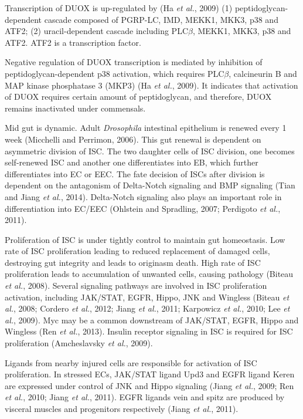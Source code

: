 \documentclass[11pt]{article}
\begin{document}
\begin{sloppypar}
Transcription of DUOX is up-regulated by (Ha \textit{et al.}, 2009) 
(1) peptidoglycan-dependent cascade composed of PGRP-LC, IMD, MEKK1, MKK3, p38 and ATF2; 
(2) uracil-dependent cascade including PLC$\beta$, MEKK1, MKK3, p38 and ATF2. 
ATF2 is a transcription factor. 
\par
Negative regulation of DUOX transcription is mediated by inhibition of peptidoglycan-dependent p38 activation, which requires PLC$\beta$, calcineurin B and MAP kinase phosphatase 3 (MKP3) (Ha \textit{et al.}, 2009). 
It indicates that activation of DUOX requires certain amount of peptidoglycan, and therefore, DUOX remains inactivated under commensals.
\par
Mid gut is dynamic. 
Adult \textit{Drosophila} intestinal epithelium is renewed every 1 week (Micchelli and Perrimon, 2006). 
This gut renewal is dependent on asymmetric division of ISC. 
The two daughter cells of ISC division, one becomes self-renewed ISC and another one differentiates into EB, which further differentiates into EC or EEC. 
The fate decision of ISCs after division is dependent on the antagonism of Delta-Notch signaling and BMP signaling (Tian and Jiang \textit{et al.}, 2014). 
Delta-Notch signaling also plays an important role in differentiation into EC/EEC (Ohlstein and Spradling, 2007; Perdigoto \textit{et al.}, 2011). 
\par
Proliferation of ISC is under tightly control to maintain gut homeostasis. 
Low rate of ISC proliferation leading to reduced replacement of damaged cells, destroying gut integrity and leads to originasm death. 
High rate of ISC proliferation leads to accumulation of unwanted cells, causing pathology (Biteau \textit{et al.}, 2008). 
Several signaling pathways are involved in ISC proliferation activation, including JAK/STAT, EGFR, Hippo, JNK and Wingless (Biteau \textit{et al.}, 2008; Cordero \textit{et al.}, 2012; Jiang \textit{et al.}, 2011; Karpowicz \textit{et al.}, 2010; Lee \textit{et al.}, 2009). 
Myc may be a common downstream of JAK/STAT, EGFR, Hippo and Wingless (Ren \textit{et al.}, 2013). 
Insulin receptor signaling in ISC is required for ISC proliferation (Amcheslavsky \textit{et al.}, 2009). 
\par
Ligands from nearby injured cells are responsible for activation of ISC proliferation. 
In stressed ECs, JAK/STAT ligand Upd3 and EGFR ligand Keren are expressed under control of JNK and Hippo signaling (Jiang \textit{et al.}, 2009; Ren \textit{et al.}, 2010; Jiang \textit{et al.}, 2011). 
EGFR ligands vein and spitz are produced by visceral muscles and progenitors respectively (Jiang \textit{et al.}, 2011). 

\end{sloppypar}
\end{document}
